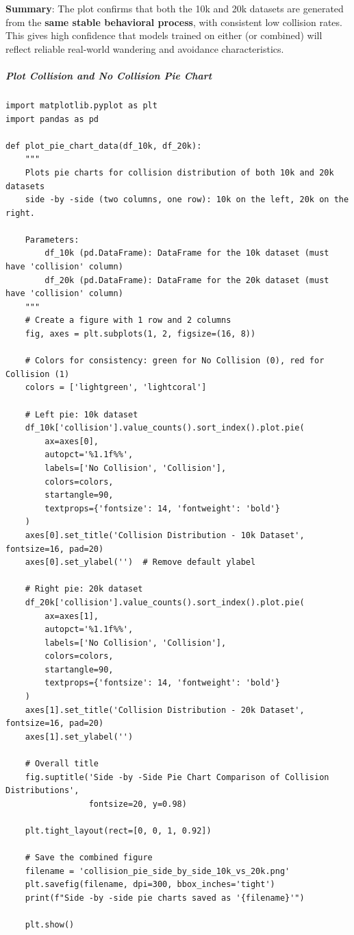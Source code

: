 \textbf{Summary}: The plot confirms that both the 10k and 20k datasets are generated from the \textbf{same stable behavioral process}, with consistent low collision rates. This gives high confidence that models trained on either (or combined) will reflect reliable real-world wandering and avoidance characteristics.

\subparagraph{Plot Collision and No Collision Pie Chart}

\begin{verbatim}
import matplotlib.pyplot as plt
import pandas as pd

def plot_pie_chart_data(df_10k, df_20k):
    """
    Plots pie charts for collision distribution of both 10k and 20k datasets
    side -by -side (two columns, one row): 10k on the left, 20k on the right.
    
    Parameters:
        df_10k (pd.DataFrame): DataFrame for the 10k dataset (must have 'collision' column)
        df_20k (pd.DataFrame): DataFrame for the 20k dataset (must have 'collision' column)
    """
    # Create a figure with 1 row and 2 columns
    fig, axes = plt.subplots(1, 2, figsize=(16, 8))
    
    # Colors for consistency: green for No Collision (0), red for Collision (1)
    colors = ['lightgreen', 'lightcoral']
    
    # Left pie: 10k dataset
    df_10k['collision'].value_counts().sort_index().plot.pie(
        ax=axes[0],
        autopct='%1.1f%%',
        labels=['No Collision', 'Collision'],
        colors=colors,
        startangle=90,
        textprops={'fontsize': 14, 'fontweight': 'bold'}
    )
    axes[0].set_title('Collision Distribution - 10k Dataset', fontsize=16, pad=20)
    axes[0].set_ylabel('')  # Remove default ylabel
    
    # Right pie: 20k dataset
    df_20k['collision'].value_counts().sort_index().plot.pie(
        ax=axes[1],
        autopct='%1.1f%%',
        labels=['No Collision', 'Collision'],
        colors=colors,
        startangle=90,
        textprops={'fontsize': 14, 'fontweight': 'bold'}
    )
    axes[1].set_title('Collision Distribution - 20k Dataset', fontsize=16, pad=20)
    axes[1].set_ylabel('')
    
    # Overall title
    fig.suptitle('Side -by -Side Pie Chart Comparison of Collision Distributions',
                 fontsize=20, y=0.98)
    
    plt.tight_layout(rect=[0, 0, 1, 0.92])
    
    # Save the combined figure
    filename = 'collision_pie_side_by_side_10k_vs_20k.png'
    plt.savefig(filename, dpi=300, bbox_inches='tight')
    print(f"Side -by -side pie charts saved as '{filename}'")
    
    plt.show()
\end{verbatim}

